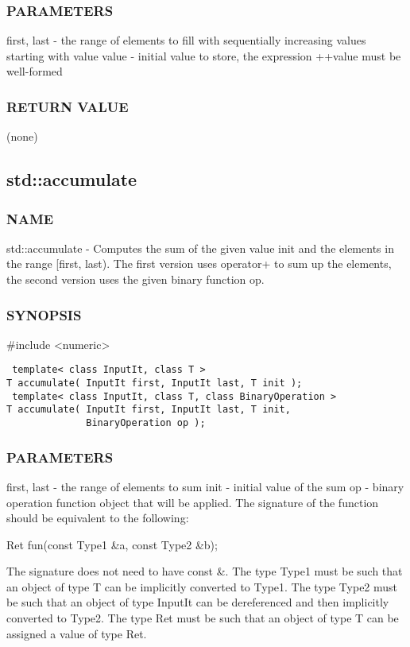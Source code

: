 \subsubsection{PARAMETERS}
first, last - the range of elements to fill with sequentially increasing values starting with value
value - initial value to store, the expression ++value must be well-formed

\subsubsection{RETURN VALUE}
(none)



\subsection{std::accumulate}

\subsubsection{NAME}
std::accumulate - Computes the sum of the given value init and the elements in the range [first, last). The first version uses operator+ to sum up the elements, the second version uses the given binary function op.

\subsubsection{SYNOPSIS}
\#include <numeric>

\begin{lstlisting}
 template< class InputIt, class T >
T accumulate( InputIt first, InputIt last, T init );
 template< class InputIt, class T, class BinaryOperation >
T accumulate( InputIt first, InputIt last, T init,
              BinaryOperation op );
\end{lstlisting}

\subsubsection{PARAMETERS}
first, last - the range of elements to sum
init - initial value of the sum
op - binary operation function object that will be applied.
The signature of the function should be equivalent to the following:

 Ret fun(const Type1 \&a, const Type2 \&b);

The signature does not need to have const \&. The type Type1 must be such that an object of type T can be implicitly converted to Type1. The type Type2 must be such that an object of type InputIt can be dereferenced and then implicitly converted to Type2. The type Ret must be such that an object of type T can be assigned a value of type Ret.

